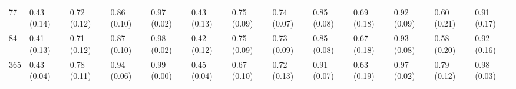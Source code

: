 \begin{tabular}{lllllllllllll}
77  &  0.43 (0.14) &  0.72 (0.12) &    0.86 (0.10) &  0.97 (0.02) &       0.43 (0.13) &  0.75 (0.09) &     0.74 (0.07) &        0.85 (0.08) &    0.69 (0.18) &  0.92 (0.09) &      0.60 (0.21) &  0.91 (0.17) \\
84  &  0.41 (0.13) &  0.71 (0.12) &    0.87 (0.10) &  0.98 (0.02) &       0.42 (0.12) &  0.75 (0.09) &     0.73 (0.09) &        0.85 (0.08) &    0.67 (0.18) &  0.93 (0.08) &      0.58 (0.20) &  0.92 (0.16) \\
365 &  0.43 (0.04) &  0.78 (0.11) &    0.94 (0.06) &  0.99 (0.00) &       0.45 (0.04) &  0.67 (0.10) &     0.72 (0.13) &        0.91 (0.07) &    0.63 (0.19) &  0.97 (0.02) &      0.79 (0.12) &  0.98 (0.03) \\
\bottomrule
\end{tabular}
